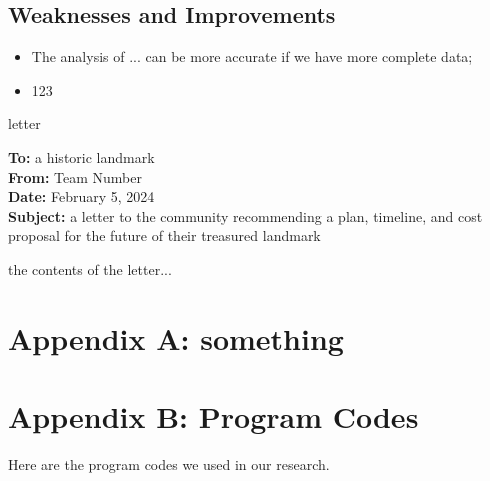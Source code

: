 \documentclass[12pt]{ctexart}
\begin{document}
\subsection{Weaknesses and Improvements}%
\begin{itemize}
	\item The analysis of ... can be more accurate if we have more complete data;
	\item 123
\end{itemize}

\begin{letter}{letter}
	\begin{flushleft}  %
		\textbf{To:} a historic landmark\\
		\textbf{From:} Team Number\\
		\textbf{Date:} February 5, 2024\\
		\textbf{Subject:} a letter to the community recommending a plan, timeline, and cost proposal 
		for the future of their treasured landmark
	\end{flushleft}
the contents of the letter...
\end{letter}


\begin{center}
\end{center}

\begin{subappendices}  %

	\section{Appendix A: something}

	\section{Appendix B: Program Codes}
	Here are the program codes we used in our research.


	

	

\end{subappendices}  %
\end{document}
